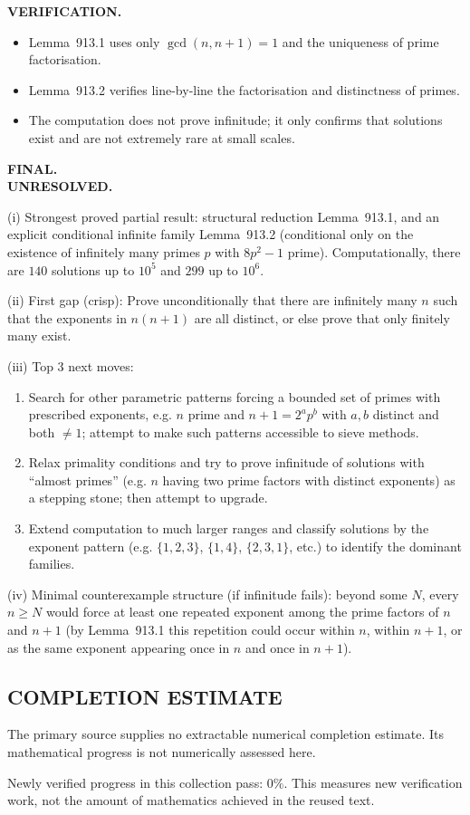 \medskip
\noindent\textbf{VERIFICATION.}\\
\begin{itemize}
\item Lemma~913.1 uses only $\gcd(n,n+1)=1$ and the uniqueness of prime factorisation.
\item Lemma~913.2 verifies line-by-line the factorisation and distinctness of primes.
\item The computation does not prove infinitude; it only confirms that solutions exist and are not extremely rare at small scales.
\end{itemize}

\medskip
\noindent\textbf{FINAL.}\\
\textbf{UNRESOLVED.}

(i) Strongest proved partial result: structural reduction Lemma~913.1, and an explicit conditional infinite family Lemma~913.2 (conditional only on the existence of infinitely many primes $p$ with $8p^2-1$ prime). Computationally, there are $140$ solutions up to $10^5$ and $299$ up to $10^6$.

(ii) First gap (crisp): Prove unconditionally that there are infinitely many $n$ such that the exponents in $n(n+1)$ are all distinct, or else prove that only finitely many exist.

(iii) Top 3 next moves:
\begin{enumerate}
\item Search for other parametric patterns forcing a bounded set of primes with prescribed exponents, e.g. $n$ prime and $n+1=2^a p^b$ with $a,b$ distinct and both $\ne 1$; attempt to make such patterns accessible to sieve methods.
\item Relax primality conditions and try to prove infinitude of solutions with ``almost primes'' (e.g. $n$ having two prime factors with distinct exponents) as a stepping stone; then attempt to upgrade.
\item Extend computation to much larger ranges and classify solutions by the exponent pattern (e.g. $\{1,2,3\}$, $\{1,4\}$, $\{2,3,1\}$, etc.) to identify the dominant families.
\end{enumerate}

(iv) Minimal counterexample structure (if infinitude fails): beyond some $N$, every $n\ge N$ would force at least one repeated exponent among the prime factors of $n$ and $n+1$ (by Lemma~913.1 this repetition could occur within $n$, within $n+1$, or as the same exponent appearing once in $n$ and once in $n+1$).




\subsection*{COMPLETION ESTIMATE}
The primary source supplies no extractable numerical completion estimate. Its mathematical progress is not numerically assessed here.

Newly verified progress in this collection pass: $0\%$. This measures new verification work, not the amount of mathematics achieved in the reused text.
